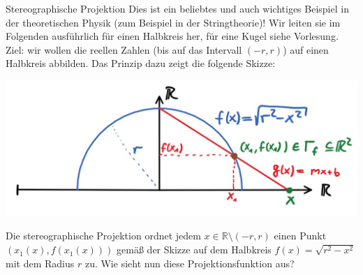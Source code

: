 \begin{Beispiel}
    {Stereographische Projektion}
    Dies ist ein beliebtes und auch wichtiges Beispiel in der theoretischen Physik (zum Beispiel in der Stringtheorie)! Wir leiten sie im Folgenden ausführlich für einen Halbkreis her, für eine Kugel siehe Vorlesung.\\
    
    Ziel: wir wollen die reellen Zahlen (bis auf das Intervall $(-r,r)$) auf einen Halbkreis abbilden. Das Prinzip dazu zeigt die folgende Skizze:
    \begin{center}
        \includegraphics[width=.8\textwidth]{Dateien/10/10StereographischeProjektion.jpg}
    \end{center}
    Die stereographische Projektion ordnet jedem $x\in\mathbb{R}\setminus(-r,r)$ einen Punkt $(x_1(x), f(x_1(x)))$ gemäß der Skizze auf dem Halbkreis $f(x)=\sqrt{r^2-x^2}$ mit dem Radius $r$ zu. Wie sieht nun diese Projektionsfunktion aus? \\
    

\end{Beispiel}
